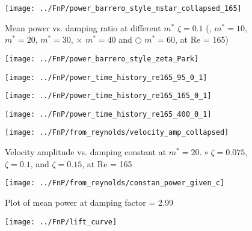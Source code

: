 \begin{figure}
\centering
\texttt{[image: ../FnP/power\_barrero\_style\_mstar\_collapsed\_165]}
\caption{Mean power vs. damping ratio at different $m^*$ $\zeta=0.1$ (, $m^*=10$, $m^*=20$,  $m^*=30$, $\times$ $m^*=40$ and  $\bigcirc$ $m^* = 60$, at Re = 165) } 
\label{fig:power_barrero_style_mstar_collapsed_165}
\end{figure}

\begin{figure}
\centering
\texttt{[image: ../FnP/power\_barrero\_style\_zeta\_Park]}
\caption{}
\label{fig:power_barrero_style_zeta_Park}
\end{figure}


 



\begin{figure}
\centering
\texttt{[image: ../FnP/power\_time\_history\_re165\_95\_0\_1]}
\caption{}
\label{fig:power_time_history_re165_95_0_1}
\end{figure}



\begin{figure}
\centering
\texttt{[image: ../FnP/power\_time\_history\_re165\_165\_0\_1]}
\caption{}
\label{fig:power_time_history_re165_85_0}
\end{figure}




\begin{figure}
\centering
\texttt{[image: ../FnP/power\_time\_history\_re165\_400\_0\_1]}
\caption{}
\label{fig:power_time_history_re165_400_0_1}
\end{figure}


\begin{figure}[htbp]
\centering
\texttt{[image: ../FnP/from\_reynolds/velocity\_amp\_collapsed]}
\caption{Velocity amplitude vs. damping constant at $m^*=20$. $\circ$ $\zeta = 0.075$,  $ \zeta = 0.1$,  and $\zeta = 0.15$, at Re = 165}
\label{velocity_amplitude_damping_constant_diff_zeta}
\end{figure}



\begin{figure}[htbp]
\centering
\texttt{[image: ../FnP/from\_reynolds/constan\_power\_given\_c]}
\caption{Plot of mean power at  damping factor = 2.99}
\label{fig:constan_power_given_c}
\end{figure}




\begin{figure}
\centering
\texttt{[image: ../FnP/lift\_curve]}
\caption{}
\label{fig:lift_curve}
\end{figure}















